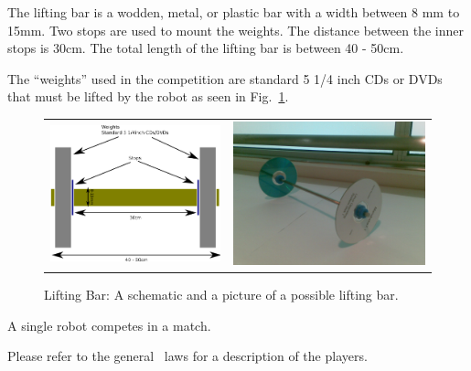 \documentclass[12pt]{hurocup}
\begin{document}
\begin{lawlist}[WL]

\item The lifting bar is a wodden, metal, or plastic bar with a width
 between 8 mm to 15mm. Two stops are used to mount the weights. The
distance between the inner stops is 30cm. The total length of the
lifting bar is between 40 - 50cm.

\item The ``weights'' used in the competition are standard 5 1/4 inch
 CDs or DVDs that must be lifted by the robot as seen in
 Fig.~\ref{fig:lifting-bar}.

\begin{figure}
\begin{center}
\begin{tabular}{cc}
\includegraphics[width=0.4\linewidth]{Figures/lifting-bar-diagram} 
&
\includegraphics[width=0.4\linewidth]{Figures/lifting-bar1} 
\end{tabular}
\caption{Lifting Bar: A schematic and a picture of a possible lifting
bar.}
\label{fig:lifting-bar}
\end{center}
\end{figure}

\end{lawlist}


\begin{lawlist}[WL]
\item A single robot competes in a match.
\end{lawlist}


Please refer to the general \HuroCup\ laws for a description of
the players.
\end{document}
